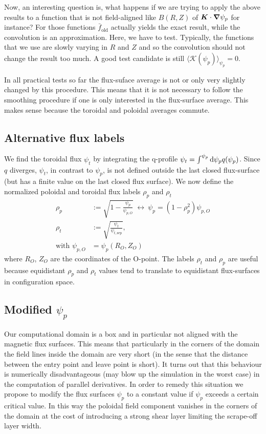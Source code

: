 Now, an interesting question is, what happens if we are trying to apply the above
results to a function that is not field-aligned like $B(R,Z)$ of ${\boldsymbol{K}}\cdot{\boldsymbol{\nabla}}\psi_p$ for instance? For those functions $\bar f_\mathrm{old}$ actually yields the exact
result, while the convolution is an approximation.
Here, we have to test.
Typically, the functions that we use are slowly varying in $R$ and $Z$ and
so the convolution should not change the result too much.
A good test candidate is still $\langle \mathcal K(\psi_p)\rangle_{\psi_p}=0$.

In all practical tests so far the flux-suface average is not or only very slightly changed by this procedure.
This means that it is not
necessary to follow the smoothing procedure if one is only interested in the flux-surface average.
This makes sense because the toroidal and poloidal averages commute.

\subsection{Alternative flux labels}
We find the toroidal flux $\psi_t$ by integrating the q-profile $\psi_t = \int^{\psi_p} \mathrm{d}\psi_p q(\psi_p)$. Since $q$ diverges, $\psi_t$, in contrast to $\psi_p$,
is not defined outside the last closed flux-surface (but has a finite value on the last closed flux surface). We now define the normalized poloidal and toroidal flux labels $\rho_p$ and $\rho_t$
\begin{align}
    \rho_p&:= \sqrt{1-\frac{\psi_p }{\psi_{p,O}}} \ \leftrightarrow\ \psi_p = (1-\rho_p^2)\psi_{p,O} \\
    \rho_t&:= \sqrt{\frac{\psi_t}{\psi_{t,\mathrm{sep}}}},\\
    \text{with }\psi_{p,O} &= \psi_p(R_O, Z_O)%
\end{align}
where $R_O$, $Z_O$ are the coordinates of the O-point.
The labels $\rho_t$ and $\rho_p$ are useful because
equidistant $\rho_p$ and $\rho_t$ values tend to translate to equidistant flux-surfaces
in configuration space.

\subsection{ Modified $\psi_p$}
Our computational domain is a box and in particular not aligned with the
magnetic flux surfaces. This means that particularly in the corners of
the domain the field lines inside the domain are very short (in the
sense that the distance between the entry point and leave point is short).
It turns out that this behaviour is numerically disadvantageous (may
blow up the simulation in the worst case) in the
computation of parallel derivatives. In order to remedy this situation
we propose to modify the flux surfaces $\psi_p$ to a constant value
if $\psi_p$ exceeds a certain critical value. In this way the poloidal
field component vanishes in the corners of the domain at the cost
of introducing a strong shear layer limiting the scrape-off layer width.

